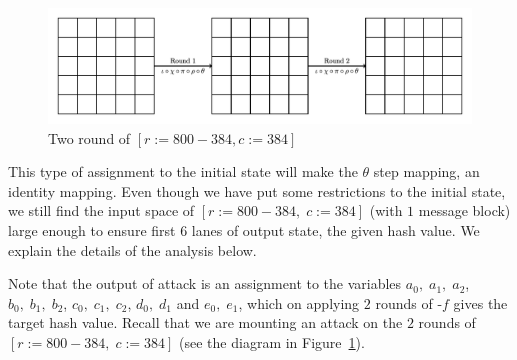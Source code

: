 \begin{figure}[H]
    \centering
    \includegraphics[scale=0.7]{keccak2Rstate.pdf}
    \caption{Two round of \KECCAK$[r:=800-384, c:=384]$}
    \label{two_rnd}
\end{figure}

This type of assignment to the initial state will make the {$\theta$} step mapping, an identity mapping. Even though we have put some restrictions to the initial state, we still find the input space of \KECCAK{}$[r:=800-384,\; c:=384]$ (with $1$ message block) large enough to ensure first $6$ lanes of output state, the given hash value. We explain the details of the analysis below. 

Note that the output of attack is an assignment to the variables $a_0,\; a_1,\; a_2$, $b_0,\; b_1,\; b_2$, $c_0,\; c_1,\; c_2$, $d_0,\; d_1$ and $e_0,\; e_1$, which on applying $2$ rounds of \KECCAK-$f$ gives the target hash value. Recall that we are mounting an attack on the $2$ rounds of \KECCAK{}$[r:=800-384,\; c:=384]$ (see the diagram in Figure~\ref{two_rnd}).

